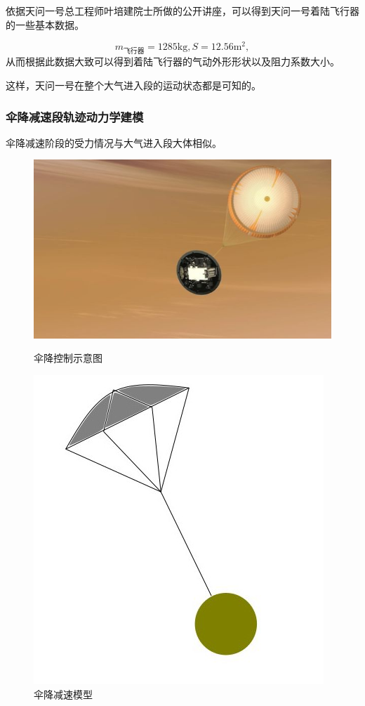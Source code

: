 \documentclass[UTF8,12pt]{ctexart}
\begin{document}
依据天问一号总工程师叶培建院士所做的公开讲座，可以得到天问一号着陆飞行器的一些基本数据。

\begin{equation}
m_{飞行器}=1285\mathrm{kg},
S=12.56\mathrm{m^2},
\end{equation}
从而根据此数据大致可以得到着陆飞行器的气动外形形状以及阻力系数大小。

这样，天问一号在整个大气进入段的运动状态都是可知的。

\subsubsection{伞降减速段轨迹动力学建模}

伞降减速阶段的受力情况与大气进入段大体相似。
\begin{figure}[htb]
	\begin{minipage}[t]{0.5\textwidth}
		\centering
		\includegraphics[scale=0.4]{伞降控制.png}
		\caption{伞降控制示意图\label{fig:1}}
	\end{minipage}
	\qquad
	\begin{minipage}[t]{0.5\textwidth}
		\centering
		\includegraphics[scale=0.5]{降落伞减速.png}
		\caption{伞降减速模型\label{fig:2}}
	\end{minipage}
\end{figure}
\end{document}
